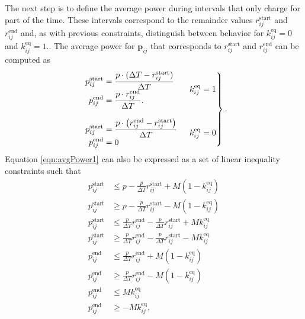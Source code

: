 	\par The next step is to define the average power during intervals that only charge for part of the time.  These intervals correspond to the remainder values $r_{ij}^{\text{start}}$ and $r_{ij}^{\text{end}}$ and, as with previous constraints, distinguish between behavior for $k_{ij}^{\text{eq}} = 0$ and $k_{ij}^{\text{eq}} = 1$.. The average power for $\mathbf{p}_{ij}$ that corresponds to $r_{ij}^{\text{start}}$ and $r_{ij}^{\text{end}}$ can be computed as 
\begin{equation}\label{eqn:avgPower1}\begin{aligned}
	\begin{rcases}
	\begin{array}{l} \begin{aligned}
		p^{\text{start}}_{ij} &= \frac{p\cdot (\Delta T - r^{\text{start}}_{ij})}{\Delta T}\\ 
		p^{\text{end}}_{ij} &= \frac{p\cdot r^{\text{end}}_{ij}}{\Delta T}.\\
	\end{aligned} \end{array} & k_{ij}^{\text{eq}} = 1 \\[8pt] 
	\begin{array}{l} \begin{aligned}
		p_{ij}^{\text{start}} &= \frac{p\cdot \left ( r_{ij}^{\text{end}} - r_{ij}^{\text{start}} \right )}{\Delta T} \\
		p_{ij}^{\text{end}} &= 0 \\
	\end{aligned} \end{array} & k_{ij}^{\text{eq}} = 0 \\
	\end{rcases}.
\end{aligned}\end{equation}
Equation \eqref{eqn:avgPower1} can also be expressed as a set of linear inequality constraints such that
\begin{equation} \begin{aligned}
	p_{ij}^{\text{start}} &\le p - \frac{p}{\Delta T}r_{ij}^{\text{start}} + M\left ( 1 - k_{ij}^{\text{eq}} \right ) \\
	p_{ij}^{\text{start}} &\ge p - \frac{p}{\Delta T}r_{ij}^{\text{start}} - M\left ( 1 - k_{ij}^{\text{eq}} \right ) \\ 
	p_{ij}^{\text{start}} &\le \frac{p}{\Delta T}r_{ij}^{\text{end}} - \frac{p}{\Delta T}r_{ij}^{\text{start}} + Mk_{ij}^{\text{eq}}\\
	p_{ij}^{\text{start}} &\ge \frac{p}{\Delta T}r_{ij}^{\text{end}} - \frac{p}{\Delta T}r_{ij}^{\text{start}} - Mk_{ij}^{\text{eq}}\\ 
	p_{ij}^{\text{end}}   &\le \frac{p}{\Delta T}r_{ij}^{\text{end}} + M\left ( 1 - k_{ij}^{\text{eq}} \right )\\
	p_{ij}^{\text{end}}   &\ge \frac{p}{\Delta T}r_{ij}^{\text{end}} - M\left ( 1 - k_{ij}^{\text{eq}} \right )\\
	p_{ij}^{\text{end}}   &\le Mk_{ij}^{\text{eq}}\\
	p_{ij}^{\text{end}}   &\ge - Mk_{ij}^{\text{eq}},\\
\end{aligned} \end{equation}
